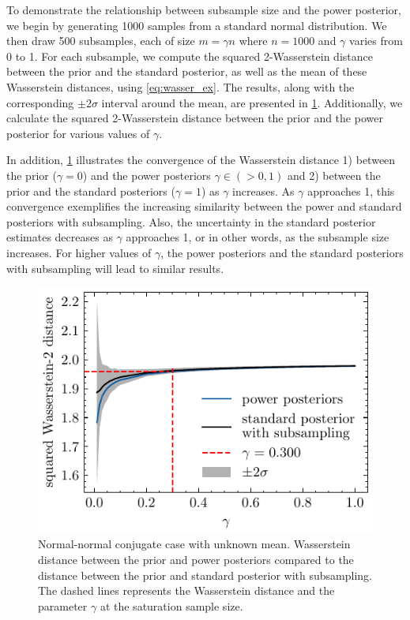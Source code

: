 \documentclass[12pt]{article}
\begin{document}
To demonstrate the relationship between subsample size and the power posterior, we begin by generating 1000 samples from a standard normal distribution. We then draw 500 subsamples, each of size $m = \gamma n$ where $n = 1000$ and $\gamma$ varies from 0 to 1. For each subsample, we compute the squared 2-Wasserstein distance between the prior and the standard posterior, as well as the mean of these Wasserstein distances, using \cref{eq:wasser_ex}. The results, along with the corresponding $\pm 2\sigma$  interval around the mean, are presented in \cref{fig:normal_normal_compare_with_subsampling}. Additionally, we calculate the squared 2-Wasserstein distance between the prior and the power posterior for various values of $\gamma$. 

In addition, \cref{fig:normal_normal_compare_with_subsampling} illustrates the convergence of the Wasserstein distance 1) between the prior ($\gamma=0$) and the power posteriors $\gamma \in (>0, 1)$ and  2) between the prior and the standard posteriors ($\gamma=1$)  as $\gamma$ increases. As $\gamma$ approaches 1, this convergence exemplifies the increasing similarity between the power and standard posteriors with subsampling. Also, the uncertainty in the standard posterior estimates decreases as $\gamma$ approaches 1, or in other words, as the subsample size increases. For higher values of $\gamma$, the power posteriors and the standard posteriors with subsampling will lead to similar results. 

\begin{figure}[h!]
\begin{center}
\includegraphics{imgs/sat_samplesize_100_99.pdf}
\end{center}
\caption{Normal-normal conjugate case with unknown mean. Wasserstein distance between the prior and power posteriors compared to the distance between the prior and standard posterior with subsampling. The dashed lines represents the Wasserstein distance and the parameter $\gamma$ at the saturation sample size.}\label{fig:normal_normal_compare_with_subsampling}
\end{figure}
\end{document}
